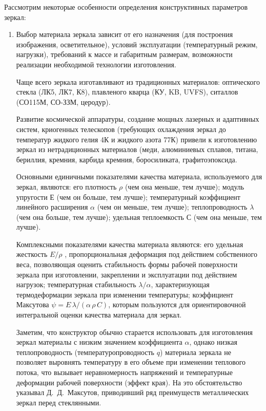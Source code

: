 Рассмотрим некоторые особенности определения конструктивных параметров зеркал:
\begin{enumerate}[leftmargin=*]
\item Выбор материала зеркала зависит от его назначения (для построения изображения, осветительное), условий эксплуатации (температурный режим, нагрузки), требований к массе и габаритным размерам, возможности реализации необходимой технологии изготовления. 

Чаще всего зеркала изготавливают из традиционных материалов: оптического стекла (ЛК5, ЛК7, К8), плавленого кварца (КУ, KB, UVFS), ситаллов (СО115М, СО-ЗЗМ, церодур).

Развитие космической аппаратуры, создание мощных лазерных и адаптивных систем, криогенных телескопов (требующих охлаждения зеркал до температур жидкого гелия 4К и жидкого азота 77К) привели к изготовлению зеркал из нетрадиционных материалов (меди, алюминиевых сплавов, титана, бериллия, кремния, карбида кремния, боросиликата, графитоэпоксида.

Основными единичными показателями качества материала, используемого для зеркал, являются: его плотность $ \rho $ (чем она меньше, тем лучше); модуль упругости $ Е $ (чем он больше, тем лучше); температурный коэффициент линейного расширения $ \alpha $ (чем он меньше, тем лучше); теплопроводность $ \lambda $ (чем она больше, тем лучше); удельная теплоемкость $ С $ (чем она меньше, тем лучше).

Комплексными показателями качества материала являются: его удельная жесткость $ E/\rho $ , пропорциональная деформация под действием собственного веса, позволяющая оценить стабильность формы рабочей поверхности зеркала при изготовлении, закреплении и эксплуатации под действием нагрузок; температурная стабильность $ \lambda/\alpha $, характеризующая термодеформации зеркала при изменении температуры; коэффициент Максутова $ \psi = E\,\lambda/(\alpha\,\rho\,C) $, которым пользуются для ориентировочной интегральной оценки качества материала для зеркал.

Заметим, что конструктор обычно старается использовать для изготовления зеркал материалы с низким значением коэффициента $ \alpha $, однако низкая теплопроводность (температуропроводность $ q $) материала зеркала не позволяет выровнять температуру в его объеме при изменении теплового потока, что вызывает неравномерность напряжений и температурные деформации рабочей поверхности (эффект края). На это обстоятельство указывал Д.~Д.~Максутов, приводивший ряд преимуществ металлических зеркал перед стеклянными.


\end{enumerate}
